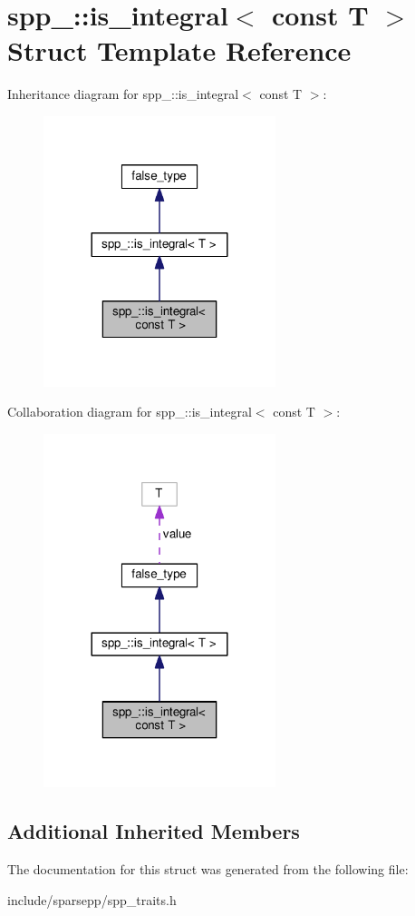 \hypertarget{structspp___1_1is__integral_3_01const_01_t_01_4}{}\section{spp\+\_\+\+:\+:is\+\_\+integral$<$ const T $>$ Struct Template Reference}
\label{structspp___1_1is__integral_3_01const_01_t_01_4}


Inheritance diagram for spp\+\_\+\+:\+:is\+\_\+integral$<$ const T $>$\+:\nopagebreak
\begin{figure}[H]
\begin{center}
\leavevmode
\includegraphics[width=192pt]{structspp___1_1is__integral_3_01const_01_t_01_4__inherit__graph}
\end{center}
\end{figure}


Collaboration diagram for spp\+\_\+\+:\+:is\+\_\+integral$<$ const T $>$\+:\nopagebreak
\begin{figure}[H]
\begin{center}
\leavevmode
\includegraphics[width=192pt]{structspp___1_1is__integral_3_01const_01_t_01_4__coll__graph}
\end{center}
\end{figure}
\subsection*{Additional Inherited Members}


The documentation for this struct was generated from the following file\+:\begin{DoxyCompactItemize}
\item 
include/sparsepp/spp\+\_\+traits.\+h\end{DoxyCompactItemize}

